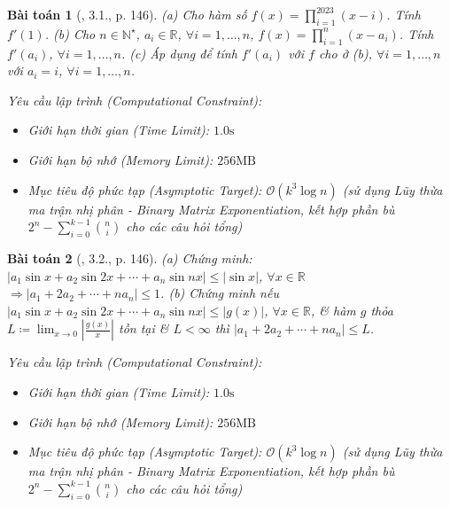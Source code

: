 \documentclass{article}
\newtheorem{baitoan}{Bài toán}
\begin{document}
\begin{baitoan}[\cite{Quoc_Long_Dat_Nam_VMC}, 3.1., p. 146]
	(a) Cho hàm số $f(x) = \prod_{i=1}^{2023} (x - i)$. Tính $f'(1)$. (b) Cho $n\in\mathbb{N}^\star$, $a_i\in\mathbb{R}$, $\forall i = 1,\ldots,n$, $f(x) = \prod_{i=1}^n (x - a_i)$. Tính $f'(a_i)$, $\forall i = 1,\ldots,n$. (c) Áp dụng để tính $f'(a_i)$ với $f$ cho ở (b), $\forall i = 1,\ldots,n$ với $a_i = i$, $\forall i = 1,\ldots,n$.

    \vspace{0.5em}
    \emph{Yêu cầu lập trình (Computational Constraint):}
    \begin{itemize}
        \item Giới hạn thời gian (Time Limit): $1.0\mathrm{s}$
        \item Giới hạn bộ nhớ (Memory Limit): $256\mathrm{MB}$
        \item Mục tiêu độ phức tạp (Asymptotic Target): $\mathcal{O}(k^3 \log n)$ (sử dụng Lũy thừa ma trận nhị phân - Binary Matrix Exponentiation, kết hợp phần bù $2^n - \sum_{i=0}^{k-1} \binom{n}{i}$ cho các câu hỏi tổng)
    \end{itemize}
\end{baitoan}


\begin{baitoan}[\cite{Quoc_Long_Dat_Nam_VMC}, 3.2., p. 146]
	(a) Chứng minh: $|a_1\sin x + a_2\sin2x + \cdots + a_n\sin nx|\le|\sin x|$, $\forall x\in\mathbb{R}$ $\Rightarrow|a_1 + 2a_2 + \cdots + na_n|\le1$. (b) Chứng minh nếu $|a_1\sin x + a_2\sin2x + \cdots + a_n\sin nx|\le|g(x)|$, $\forall x\in\mathbb{R}$, \& hàm $g$ thỏa $L\coloneqq\lim_{x\to0} \left|\frac{g(x)}{x}\right|$ tồn tại \& $L < \infty$ thì $|a_1 + 2a_2 + \cdots + na_n|\le L$.

    \vspace{0.5em}
    \emph{Yêu cầu lập trình (Computational Constraint):}
    \begin{itemize}
        \item Giới hạn thời gian (Time Limit): $1.0\mathrm{s}$
        \item Giới hạn bộ nhớ (Memory Limit): $256\mathrm{MB}$
        \item Mục tiêu độ phức tạp (Asymptotic Target): $\mathcal{O}(k^3 \log n)$ (sử dụng Lũy thừa ma trận nhị phân - Binary Matrix Exponentiation, kết hợp phần bù $2^n - \sum_{i=0}^{k-1} \binom{n}{i}$ cho các câu hỏi tổng)
    \end{itemize}
\end{baitoan}
\end{document}
